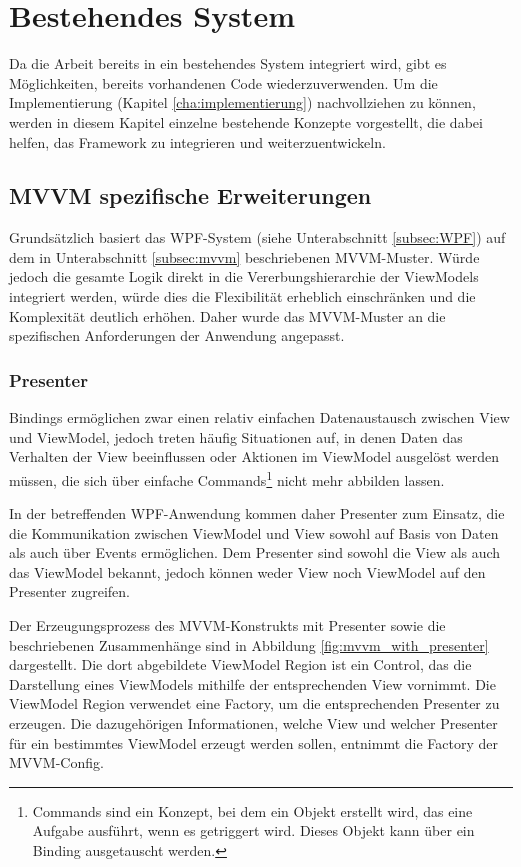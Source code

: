 \chapter{Bestehendes System}
\label{cha:basis}
Da die Arbeit bereits in ein bestehendes System integriert wird, gibt es Möglichkeiten, bereits vorhandenen Code wiederzuverwenden. Um die Implementierung (Kapitel \ref{cha:implementierung}) nachvollziehen zu können, werden in diesem Kapitel einzelne bestehende Konzepte vorgestellt, die dabei helfen, das Framework zu integrieren und weiterzuentwickeln.

\section{MVVM spezifische Erweiterungen}
\label{sec:mvvm_extensions}
Grundsätzlich basiert das WPF-System (siehe Unterabschnitt \ref{subsec:WPF}) auf dem in Unterabschnitt \ref{subsec:mvvm} beschriebenen MVVM-Muster. Würde jedoch die gesamte Logik direkt in die Vererbungshierarchie der ViewModels integriert werden, würde dies die Flexibilität erheblich einschränken und die Komplexität deutlich erhöhen. Daher wurde das MVVM-Muster an die spezifischen Anforderungen der Anwendung angepasst.

\subsection{Presenter}
Bindings ermöglichen zwar einen relativ einfachen Datenaustausch zwischen View und ViewModel, jedoch treten häufig Situationen auf, in denen Daten das Verhalten der View beeinflussen oder Aktionen im ViewModel ausgelöst werden müssen, die sich über einfache Commands\footnote{Commands \cite{wpf_commanding_overview} sind ein Konzept, bei dem ein Objekt erstellt wird, das eine Aufgabe ausführt, wenn es getriggert wird. Dieses Objekt kann über ein Binding ausgetauscht werden.} nicht mehr abbilden lassen. 

In der betreffenden WPF-Anwendung kommen daher Presenter zum Einsatz, die die Kommunikation zwischen ViewModel und View sowohl auf Basis von Daten als auch über Events ermöglichen. Dem Presenter sind sowohl die View als auch das ViewModel bekannt, jedoch können weder View noch ViewModel auf den Presenter zugreifen.

Der Erzeugungsprozess des MVVM-Konstrukts mit Presenter sowie die beschriebenen Zusammenhänge sind in Abbildung \ref{fig:mvvm_with_presenter} dargestellt. Die dort abgebildete ViewModel Region ist ein Control, das die Darstellung eines ViewModels mithilfe der entsprechenden View vornimmt. Die ViewModel Region verwendet eine Factory, um die entsprechenden Presenter zu erzeugen. Die dazugehörigen Informationen, welche View und welcher Presenter für ein bestimmtes ViewModel erzeugt werden sollen, entnimmt die Factory der MVVM-Config. 


